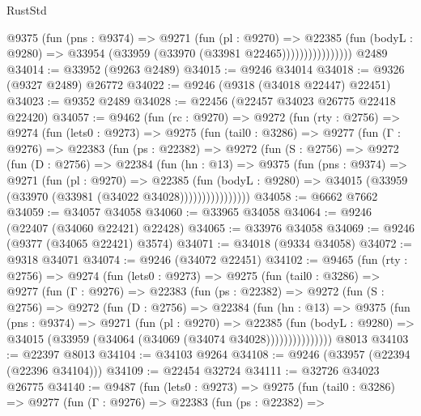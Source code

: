 \begin{lexlean}{RustStd}
\begin{coremodule}
                      @9375
                        (fun (pns : @9374) =>
                        @9271
                          (fun (pl : @9270) =>
                          @22385
                            (fun (bodyL : @9280) =>
                            @33954 (@33959 (@33970 (@33981 @22465))))))))))))))))
    @2489
@34014 := @33952 (@9263 @2489)
@34015 := @9246 @34014
@34018 := @9326 (@9327 @2489) @26772
@34022 := @9246 (@9318 (@34018 @22447) @22451)
@34023 := @9352 @2489
@34028 := @22456 (@22457 @34023 @26775 @22418 @22420)
@34057 := @9462
    (fun (rc : @9270) =>
    @9272
      (fun (rty : @2756) =>
      @9274
        (fun (lets0 : @9273) =>
        @9275
          (fun (tail0 : @3286) =>
          @9277
            (fun (Γ : @9276) =>
            @22383
              (fun (ps : @22382) =>
              @9272
                (fun (S : @2756) =>
                @9272
                  (fun (D : @2756) =>
                  @22384
                    (fun (hn : @13) =>
                    @9375
                      (fun (pns : @9374) =>
                      @9271
                        (fun (pl : @9270) =>
                        @22385
                          (fun (bodyL : @9280) =>
                          @34015 (@33959 (@33970 (@33981 (@34022 @34028))))))))))))))))
@34058 := @6662 @7662
@34059 := @34057 @34058
@34060 := @33965 @34058
@34064 := @9246 (@22407 (@34060 @22421) @22428)
@34065 := @33976 @34058
@34069 := @9246 (@9377 (@34065 @22421) @3574)
@34071 := @34018 (@9334 @34058)
@34072 := @9318 @34071
@34074 := @9246 (@34072 @22451)
@34102 := @9465
    (fun (rty : @2756) =>
    @9274
      (fun (lets0 : @9273) =>
      @9275
        (fun (tail0 : @3286) =>
        @9277
          (fun (Γ : @9276) =>
          @22383
            (fun (ps : @22382) =>
            @9272
              (fun (S : @2756) =>
              @9272
                (fun (D : @2756) =>
                @22384
                  (fun (hn : @13) =>
                  @9375
                    (fun (pns : @9374) =>
                    @9271
                      (fun (pl : @9270) =>
                      @22385
                        (fun (bodyL : @9280) =>
                        @34015 (@33959 (@34064 (@34069 (@34074 @34028)))))))))))))))
    @8013
@34103 := @22397 @8013
@34104 := @34103 @9264
@34108 := @9246 (@33957 (@22394 (@22396 @34104)))
@34109 := @22454 @32724
@34111 := @32726 @34023 @26775
@34140 := @9487
    (fun (lets0 : @9273) =>
    @9275
      (fun (tail0 : @3286) =>
      @9277
        (fun (Γ : @9276) =>
        @22383
          (fun (ps : @22382) =>

\end{coremodule}
\end{lexlean}
